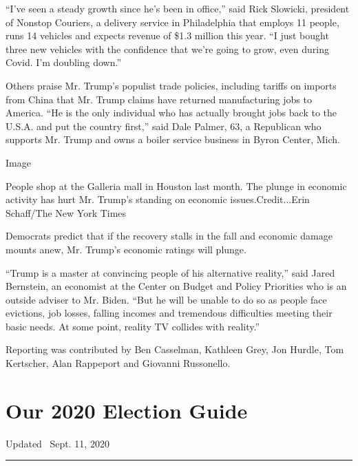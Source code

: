 ``I've seen a steady growth since he's been in office,'' said Rick
Slowicki, president of Nonstop Couriers, a delivery service in
Philadelphia that employs 11 people, runs 14 vehicles and expects
revenue of \$1.3 million this year. ``I just bought three new vehicles
with the confidence that we're going to grow, even during Covid. I'm
doubling down.''

Others praise Mr. Trump's populist trade policies, including tariffs on
imports from China that Mr. Trump claims have returned manufacturing
jobs to America. ``He is the only individual who has actually brought
jobs back to the U.S.A. and put the country first,'' said Dale Palmer,
63, a Republican who supports Mr. Trump and owns a boiler service
business in Byron Center, Mich.

Image

People shop at the Galleria mall in Houston last month. The plunge in
economic activity has hurt Mr. Trump's standing on economic
issues.Credit...Erin Schaff/The New York Times

Democrats predict that if the recovery stalls in the fall and economic
damage mounts anew, Mr. Trump's economic ratings will plunge.

``Trump is a master at convincing people of his alternative reality,''
said Jared Bernstein, an economist at the Center on Budget and Policy
Priorities who is an outside adviser to Mr. Biden. ``But he will be
unable to do so as people face evictions, job losses, falling incomes
and tremendous difficulties meeting their basic needs. At some point,
reality TV collides with reality.''

Reporting was contributed by Ben Casselman, Kathleen Grey, Jon Hurdle,
Tom Kertscher, Alan Rappeport and Giovanni Russonello.

\hypertarget{our-2020-election-guide}{%
\section{Our 2020 Election Guide}\label{our-2020-election-guide}}

Updated ~Sept. 11, 2020

\begin{center}\rule{0.5\linewidth}{\linethickness}\end{center}

